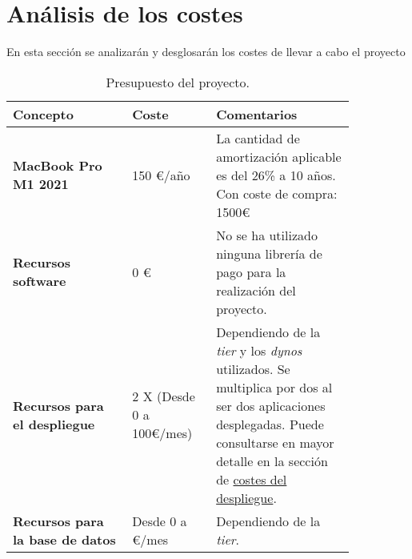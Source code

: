 \chapter{Análisis de los costes}
En esta sección se analizarán y desglosarán los costes de llevar a cabo el proyecto\\

\begin{table}[H]
    \centering
    \begin{center}
        \begin{tabular}{| p{0.3\linewidth} | p{0.2\linewidth} | p{0.35\linewidth}|}
            \hline
            \rowcolor[HTML]{ECF4FF} 
            \textbf{Concepto} & \textbf{Coste} & \textbf{Comentarios}\\ \hline
            \textbf{MacBook Pro M1 2021} & 150 €/año & La cantidad de amortización aplicable es del 26\% a 10 años. Con
            coste de compra: 1500€\\
            \textbf{Recursos software} & 0 € & No se ha utilizado ninguna librería de pago para la realización del
            proyecto.\\
            \textbf{Recursos para el despliegue } & 2 X (Desde 0 a 100€/mes) & Dependiendo de la \textit{tier} y los
            \textit{dynos} utilizados. Se multiplica por dos al ser dos aplicaciones desplegadas. Puede consultarse en
            mayor detalle en la sección de \hyperref[sec:costes-despliegue]{costes del despliegue}.\\
            \textbf{Recursos para la base de datos} & Desde 0 a €/mes & Dependiendo de la \textit{tier}.\\
            \hline
        \end{tabular}
        \caption{Presupuesto del proyecto.}
    \end{center}
\end{table}
